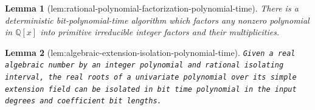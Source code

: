 \documentclass{article}
\newtheorem{lemma}{Lemma}
\begin{document}
\begin{lemma}[lem:rational-polynomial-factorization-polynomial-time]\label{lem:rational-polynomial-factorization-polynomial-time}
There is a deterministic bit-polynomial-time algorithm which factors any nonzero polynomial in \(\mathbb Q[x]\) into primitive irreducible integer factors and their multiplicities.
\end{lemma}

\begin{lemma}[lem:algebraic-extension-isolation-polynomial-time]\label{lem:algebraic-extension-isolation-polynomial-time}
\texttt{Given a real algebraic number by an integer polynomial and rational isolating interval,\allowbreak{} the real roots of a univariate polynomial over its simple extension field can be isolated in bit time polynomial in the input degrees and coefficient bit lengths.}
\end{lemma}
\end{document}
